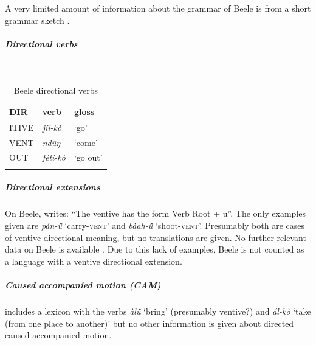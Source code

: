 A very limited amount of information about the grammar of Beele is from a short grammar sketch \citep{schuhBoleTangaleLanguagesBauchi1978}. 

\subparagraph{Directional verbs}~



\begin{table}[H]
	\caption{Beele directional verbs} 
	\label{tab:beelV}
	\begin{tabular}{lll} %
		\lsptoprule
		DIR & verb & gloss   \\ %
		\midrule
		ITIVE & \textit{jíi-kò} & `go' \\
		VENT & \textit{ndûŋ} & `come' \\
		OUT & \textit{fétí-kò}  &  `go out' \\
		\lspbottomrule
	\end{tabular}
\end{table}

\subparagraph{Directional extensions}


On Beele, \citet[21]{schuhBoleTangaleLanguagesBauchi1978} writes: ``The ventive has the form Verb Root + u''. The only examples given are \textit{pán-ũ̂} `carry-\textsc{vent}' and \textit{bàah-ũ̂} `shoot-\textsc{vent}'. Presumably both are cases of ventive directional meaning, but no translations are given. No further relevant data on Beele is available \citep[cf.][292]{zochVerbalmorphologieBoleTangaleSprachenWesttschadisch2014}. Due to this lack of examples, Beele is not counted as a language with a ventive directional extension.

\subparagraph{Caused accompanied motion (CAM)}



\citet[26]{schuhBoleTangaleLanguagesBauchi1978} includes a lexicon with the verbs \textit{àlũ̂} `bring' (presumably ventive?) and \textit{ál-kò} `take (from one place to another)' but no other information is given about directed caused accompanied motion.

